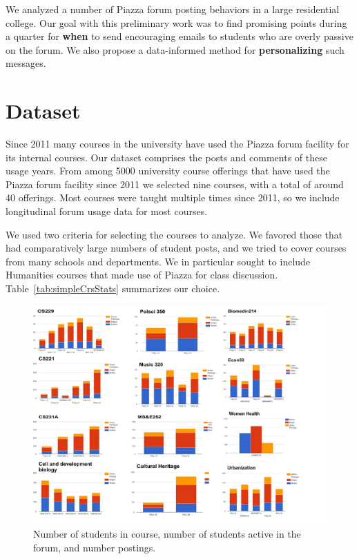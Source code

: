 We analyzed a number of Piazza forum posting behaviors in a large
residential college. Our goal with this preliminary work was to find
promising points during a quarter for {\bf when} to send encouraging
emails to students who are overly passive on the forum. We also
propose a data-informed method for {\bf personalizing} such messages.

\section{Dataset}

Since 2011 many courses in the university have used the Piazza forum
facility for its internal courses. Our dataset comprises the posts and
comments of these usage years. From among 5000 university course
offerings that have used the Piazza forum facility since 2011 we
selected nine courses, with a total of around 40 offerings. Most
courses were taught multiple times since 2011, so we include
longitudinal forum usage data for most courses.

We used two criteria for selecting the courses to analyze. We favored
those that had comparatively large numbers of student posts, and we
tried to cover courses from many schools and departments. We in
particular sought to include Humanities courses that made use of
 Piazza for class discussion. Table~\ref{tab:simpleCrsStats} summarizes
 our choice.
 
 \begin{figure}[htp]
       \centering
       \includegraphics[width=1.2\textwidth]{Figs/nodes2.pdf}
       \caption{\textnormal{Number of students in course, number of
           students active in the forum, and number postings.}}
       \label{fig:graphExpl}
\end{figure}
 
